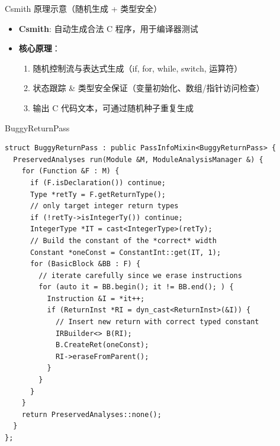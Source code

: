\documentclass{beamer}
\begin{document}
\begin{frame}{Csmith 原理示意（随机生成 + 类型安全）}

\begin{itemize}
  \item \textbf{Csmith}: 自动生成合法 C 程序，用于编译器测试
  \item \textbf{核心原理}：
  \begin{enumerate}
    \item 随机控制流与表达式生成（if, for, while, switch, 运算符）
    \item 状态跟踪 \& 类型安全保证（变量初始化、数组/指针访问检查）
    \item 输出 C 代码文本，可通过随机种子重复生成
  \end{enumerate}
\end{itemize}

\vspace{0.5cm}
\centering
{}

\end{frame}
\begin{frame}[fragile]{BuggyReturnPass}


\begin{lstlisting}
struct BuggyReturnPass : public PassInfoMixin<BuggyReturnPass> {
  PreservedAnalyses run(Module &M, ModuleAnalysisManager &) {
    for (Function &F : M) {
      if (F.isDeclaration()) continue;
      Type *retTy = F.getReturnType();
      // only target integer return types
      if (!retTy->isIntegerTy()) continue;
      IntegerType *IT = cast<IntegerType>(retTy);
      // Build the constant of the *correct* width
      Constant *oneConst = ConstantInt::get(IT, 1);
      for (BasicBlock &BB : F) {
        // iterate carefully since we erase instructions
        for (auto it = BB.begin(); it != BB.end(); ) {
          Instruction &I = *it++;
          if (ReturnInst *RI = dyn_cast<ReturnInst>(&I)) {
            // Insert new return with correct typed constant
            IRBuilder<> B(RI);
            B.CreateRet(oneConst);
            RI->eraseFromParent();
          }
        }
      }
    }
    return PreservedAnalyses::none();
  }
};
\end{lstlisting}

\end{frame}
\end{document}

